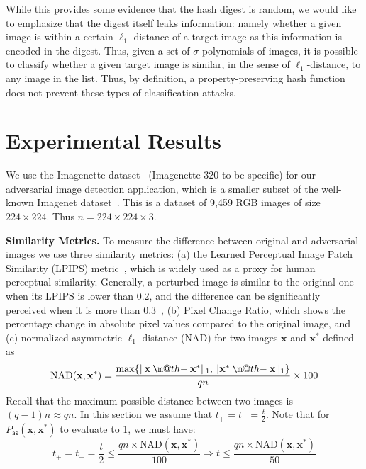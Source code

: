 \documentclass[pdflatex,sn-mathphys-num]{sn-jnl}
\makeatletter
\newcommand{\dotdiv}{\mathbin{\text{\@dotdiv}}}
\newcommand{\@dotdiv}{%
  \ooalign{\hidewidth\raise1ex\hbox{.}\hidewidth\cr$\m@th-$\cr}%
}
\newcommand{\descr}[1]{\vspace{0.2cm} \noindent \textbf{#1}}
\theoremstyle{definition}
\newcommand{\vtr}[1]{\mathbf{#1}}
\newcommand{\norm}[1]{\lVert{#1}\rVert}
\makeatother
\begin{document}
While this provides some evidence that the hash digest is random, we would like to emphasize that the digest itself leaks information: namely whether a given image is within a certain $\ell_1$-distance of a target image as this information is encoded in the digest. Thus, given a set of $\sigma$-polynomials of images, it is possible to classify whether a given target image is similar, in the sense of $\ell_1$-distance, to any image in the list. Thus, by definition, a property-preserving hash function does not prevent these types of classification attacks. 

%
%
\section{Experimental Results}
We use the Imagenette dataset~\cite{imagenette} (Imagenette-320 to be specific) for our adversarial image detection application, which is a smaller subset of the well-known Imagenet dataset~\cite{deng2009imagenet}. This is a dataset of 9,459 RGB images of size $224 \times 224$. Thus $n = 224 \times 224 \times 3$. 

\descr{Similarity Metrics.} To measure the difference between original and adversarial images we use three similarity metrics: (a) the Learned Perceptual Image Patch Similarity (LPIPS) metric~\cite{zhang2018perceptual}, which is widely used as a proxy for human perceptual similarity. Generally, a perturbed image is similar to the original one when its LPIPS is lower than 0.2, and the difference can be significantly perceived  when it is more than 0.3~\cite{zhang2018perceptual}, (b) Pixel Change Ratio, which shows the percentage change in absolute pixel values compared to the original image, and (c) normalized asymmetric $\ell_1$-distance (NAD) for two images $\vtr{x}$ and $\vtr{x}^*$ defined as
\begin{equation}
\label{eq:nad}
    \text{NAD}(\vtr{x}, \vtr{x}^*) = \frac{\max\{\norm{\vtr{x} \dotdiv \vtr{x}^*}_1, \norm{\vtr{x}^* \dotdiv \vtr{x}}_1\}}{qn} \times 100
\end{equation}
Recall that the maximum possible distance between two images is $(q-1)n \approx qn$. In this section we assume that $t_+ = t_- = \frac{t}{2}$. Note that for $P_\textsf{as}( \vtr{x}, \vtr{x}^*)$ to evaluate to 1, we must have:
\begin{equation}
\label{eq:nad-t-relation}
t_+ = t_- = \frac{t}{2} \leq \frac{qn \times \text{NAD}(\vtr{x}, \vtr{x}^*)}{100} \Rightarrow t \leq \frac{qn \times \text{NAD}(\vtr{x}, \vtr{x}^*)}{50}
\end{equation}
\end{document}
